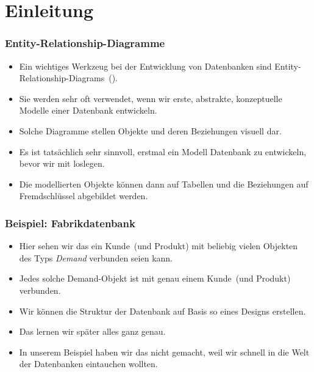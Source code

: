 \documentclass[aspectratio=169,mathserif,notheorems]{beamer}%
\subtitle{20.~Fabrik-Datenbank:~ERDs in LibreOffice Base}%
\begin{document}
%
%
\startPresentation%
%
\section{Einleitung}%
%
\begin{frame}%
\frametitle{Entity-Relationship-Diagramme}%
%
\begin{itemize}%
\item Ein wichtiges Werkzeug bei der Entwicklung von Datenbanken sind Entity-Relationship-Diagrams~().%
%
\item<2-> Sie werden sehr oft verwendet, wenn wir erste, abstrakte, konzeptuelle Modelle einer Datenbank entwickeln.%
%
\item<3-> Solche Diagramme stellen Objekte und deren Beziehungen visuell dar.%
%
\item<4->  Es ist tatsächlich sehr sinnvoll, erstmal ein Modell  Datenbank zu entwickeln, bevor wir mit  loslegen.%
%
\item<5-> Die modellierten Objekte können dann auf Tabellen und die Beziehungen auf Fremdschlüssel abgebildet werden.%
%
\end{itemize}%
\end{frame}%
%
\begin{frame}[t]%
\frametitle{Beispiel: Fabrikdatenbank}%
%
\begin{itemize}%
%
%
%
%
%
%
\item<4-> Hier sehen wir das ein Kunde~(und Produkt) mit beliebig vielen Objekten des Typs \emph{Demand} verbunden seien kann.%
%
\item<5-> Jedes solche Demand-Objekt ist mit genau einem Kunde~(und Produkt) verbunden.%
%
\item<6-> Wir können die Struktur der Datenbank auf Basis so eines Designs erstellen.%
%
\item<7-> Das lernen wir später alles ganz genau.%
%
\item<8-> In unserem Beispiel haben wir das nicht gemacht, weil wir schnell in die Welt der Datenbanken eintauchen wollten.%
\end{itemize}%
%
%
\end{frame}%
\end{document}
